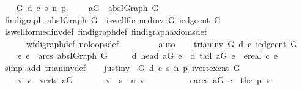 \begin{isabellebody}
\ \ \isamarkupfalse%
\ G\ d\ c\ s\ n\ p\ \isanewline
\ \ \isamarkupfalse%
\ {\isacharquery}aG\ {\isacharequal}\ {\isachardoublequoteopen}abs{\isacharunderscore}IGraph\ G{\isachardoublequoteclose}\isanewline
\ \ \isamarkupfalse%
\ {\isachardoublequoteopen}fin{\isacharunderscore}digraph\ {\isacharparenleft}abs{\isacharunderscore}IGraph\ G{\isacharparenright}\ {\isasymlongleftrightarrow}\ is{\isacharunderscore}wellformed{\isacharunderscore}inv\ G\ {\isacharparenleft}iedge{\isacharunderscore}cnt\ G{\isacharparenright}{\isachardoublequoteclose}\isanewline
\ \ \ \ \isamarkupfalse%
\ is{\isacharunderscore}wellformed{\isacharunderscore}inv{\isacharunderscore}def\ fin{\isacharunderscore}digraph{\isacharunderscore}def\ fin{\isacharunderscore}digraph{\isacharunderscore}axioms{\isacharunderscore}def\isanewline
\ \ \ \ \ \ wf{\isacharunderscore}digraph{\isacharunderscore}def\ no{\isacharunderscore}loops{\isacharunderscore}def\ \isanewline
\ \ \ \ \ \ \isamarkupfalse%
\ auto\isanewline
{}\isamarkupfalse%
\isanewline
\ \ \isamarkupfalse%
\ {\isachardoublequoteopen}trian{\isacharunderscore}inv\ G\ d\ c\ {\isacharparenleft}iedge{\isacharunderscore}cnt\ G{\isacharparenright}\ {\isacharequal}\ \isanewline
\ \ \ \ {\isacharparenleft}{\isasymforall}e{\isachardot}\ e\ {\isasymin}\ arcs\ {\isacharparenleft}abs{\isacharunderscore}IGraph\ G{\isacharparenright}\ {\isasymlongrightarrow}\ \isanewline
\ \ \ {\isacharparenleft}d\ {\isacharparenleft}head\ {\isacharquery}aG\ e{\isacharparenright}\ {\isasymle}\ d\ {\isacharparenleft}tail\ {\isacharquery}aG\ e{\isacharparenright}\ {\isacharplus}\ ereal\ {\isacharparenleft}c\ e{\isacharparenright}{\isacharparenright}{\isacharparenright}{\isachardoublequoteclose}\isanewline
\ \ \ \ \isamarkupfalse%
\ {\isacharparenleft}simp\ add{\isacharcolon}\ trian{\isacharunderscore}inv{\isacharunderscore}def{\isacharparenright}\isanewline
{}\isamarkupfalse%
\isanewline
\ \ \isamarkupfalse%
\ {\isachardoublequoteopen}just{\isacharunderscore}inv\ \ G\ d\ c\ s\ n\ p\ {\isacharparenleft}ivertex{\isacharunderscore}cnt\ G{\isacharparenright}\ {\isacharequal}\isanewline
\ \ \ \ {\isacharparenleft}{\isasymforall}v{\isachardot}\ v\ {\isasymin}\ verts\ {\isacharquery}aG\ {\isasymlongrightarrow}\isanewline
\ \ \ \ \ \ v\ {\isasymnoteq}\ s\ {\isasymlongrightarrow}\ n\ v\ {\isasymnoteq}\ {\isasyminfinity}\ {\isasymlongrightarrow}\ \isanewline
\ \ \ \ \ \ {\isacharparenleft}{\isasymexists}e{\isasymin}arcs\ {\isacharquery}aG{\isachardot}\ e\ {\isacharequal}\ the\ {\isacharparenleft}p\ v{\isacharparenright}\ {\isasymand}\isanewline

\end{isabellebody}
